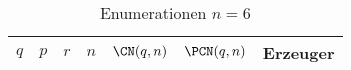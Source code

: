 \begin{longtable}[h]{llllllp{7cm}}
  \caption{Enumerationen $n=6$}\\
  $q$ & $p$ & $r$ & $n$ & $\CN(q,n)$ & $\PCN(q,n)$ & Erzeuger \\\hline
  \endhead
  
\end{longtable}


